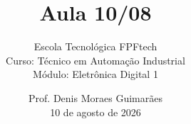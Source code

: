 
\title{Aula 10/08}

\subtitle{
\vspace{1.0cm}
Escola Tecnológica FPFtech\\
\vspace{0.5cm}
Curso: Técnico em Automação Industrial\\
\vspace{0.5cm}
Módulo: Eletrônica Digital 1
\vspace{1.0cm}
}

\author{
Prof. Denis Moraes Guimarães\\
\small 10 de agosto de 2026
}

\date{}